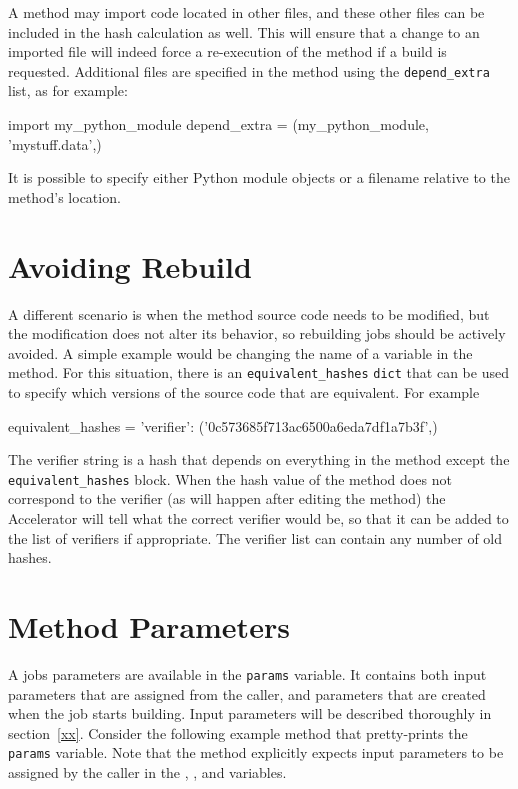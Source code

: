 A method may import code located in other files, and these other files
can be included in the hash calculation as well.  This will ensure
that a change to an imported file will indeed force a re-execution of
the method if a build is requested.  Additional files are specified in
the method using the \texttt{depend\_extra} list, as for example:
\begin{python}
import my_python_module
depend_extra = (my_python_module, 'mystuff.data',)
\end{python}
It is possible to specify either Python module objects or a filename
relative to the method's location.

\section{Avoiding Rebuild}

A different scenario is when the method source code needs to be
modified, but the modification does not alter its behavior, so
rebuilding jobs should be actively avoided.  A simple example would be
changing the name of a variable in the method.  For this situation,
there is an \texttt{equivalent\_hashes} \texttt{dict} that can be used
to specify which versions of the source code that are equivalent.  For
example
\begin{python}
equivalent_hashes = {'verifier': ('0c573685f713ac6500a6eda7df1a7b3f',)}
\end{python}
The verifier string is a hash that depends on everything in the method
except the \texttt{equivalent\_hashes} block.  When the hash value of
the method does not correspond to the verifier (as will happen after
editing the method) the Accelerator will tell what the correct
verifier would be, so that it can be added to the list of verifiers if
appropriate.  The verifier list can contain any number of old hashes.




\clearpage
\section{Method Parameters}

A jobs parameters are available in the \texttt{params} variable.  It
contains both input parameters that are assigned from the caller, and
parameters that are created when the job starts building.  Input
parameters will be described thoroughly in section~\ref{xx}.  Consider
the following example method that pretty-prints the \texttt{params}
variable.  Note that the method explicitly expects input parameters to
be assigned by the caller in the \jobids, \datasets, and \options
variables.

